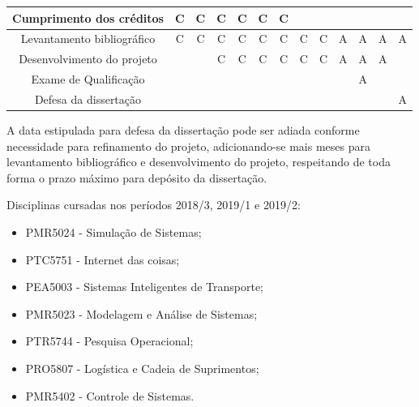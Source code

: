 \documentclass[
	12pt,				%
	oneside,			%
	a4paper,			%
	english,			%
	brazil				%
]{abntex2}
\begin{document}
\begin{table}[H]
{\begin{tabular}{|c|c|c|c|c|c|c|c|c|c|c|c|c|}
			\hline
			Cumprimento dos créditos 
			& \cellcolor[HTML]{9AFF99}C
			& \cellcolor[HTML]{9AFF99}C 
			& \cellcolor[HTML]{9AFF99}C 
			& \cellcolor[HTML]{9AFF99}C 
			& \cellcolor[HTML]{9AFF99}C 
			& \cellcolor[HTML]{9AFF99}C 
			&
			&
			&
			&
			& \\
			
			\hline
			Levantamento bibliográfico
			& \cellcolor[HTML]{9AFF99}C
			& \cellcolor[HTML]{9AFF99}C
			& \cellcolor[HTML]{9AFF99}C
			& \cellcolor[HTML]{9AFF99}C
			& \cellcolor[HTML]{9AFF99}C
			& \cellcolor[HTML]{9AFF99}C
			& \cellcolor[HTML]{9AFF99}C
			& \cellcolor[HTML]{9AFF99}C
			& \cellcolor[HTML]{FFCB2F}A
			& \cellcolor[HTML]{FFCB2F}A
			& \cellcolor[HTML]{FFCB2F}A
			& \cellcolor[HTML]{FFCB2F}A \\
			
			\hline
			Desenvolvimento do projeto
			&
			&
			& \cellcolor[HTML]{9AFF99}C
			& \cellcolor[HTML]{9AFF99}C
			& \cellcolor[HTML]{9AFF99}C
			& \cellcolor[HTML]{9AFF99}C
			& \cellcolor[HTML]{9AFF99}C
			& \cellcolor[HTML]{9AFF99}C
			& \cellcolor[HTML]{FFCB2F}A
			& \cellcolor[HTML]{FFCB2F}A
			& \cellcolor[HTML]{FFCB2F}A
			& \\ 
			
			\hline
			Exame de Qualificação
			&
			&
			&
			&
			&
			&
			&
			&
			&
			& \cellcolor[HTML]{FFCB2F}A
			&
			& \\
			
			\hline
			Defesa da dissertação
			&
			&
			&
			&
			&
			&
			&
			&
			&
			&
			&
			& \cellcolor[HTML]{FFCB2F}A \\
			\hline
			
		\end{tabular}}
		\label{tab:cronograma}
	\end{table}

	A data estipulada para defesa da dissertação pode ser adiada conforme necessidade para refinamento do projeto, adicionando-se mais meses para levantamento bibliográfico e desenvolvimento do projeto, respeitando de toda forma o prazo máximo para depósito da dissertação. 
	
	Disciplinas cursadas nos períodos 2018/3, 2019/1 e 2019/2:
	\begin{itemize}
		\item PMR5024 - Simulação de Sistemas;
		\item PTC5751 - Internet das coisas;
		\item PEA5003 - Sistemas Inteligentes de Transporte;
		\item PMR5023 - Modelagem e Análise de Sistemas;
		\item PTR5744 - Pesquisa Operacional;
		\item PRO5807 - Logística e Cadeia de Suprimentos;
		\item PMR5402 - Controle de Sistemas.
	\end{itemize}
\end{document}
